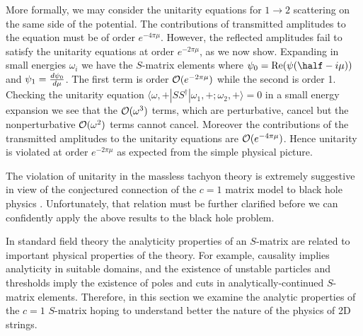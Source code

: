 More formally, we may
consider the unitarity equations for $1\to 2$ scattering on the
same side of the potential. The contributions of
 transmitted amplitudes
to the equation must be of order $e^{-4\pi \mu}$. However, the
reflected amplitudes fail to satisfy the unitarity equations at
order $e^{-2\pi \mu}$, as we now show. Expanding in small
energies $\omega_i$ we have the $S$-matrix elements
\eqn{}
where $\psi_0 = {\rm Re}(\psi(\half - i\mu))$ and
$\psi_1 = {d \psi_0 \over d\mu}$.
The first term is order ${\cal O}(e^{-2\pi\mu})$ while the second is order 1.
Checking the unitarity equation
$\langle \omega,+|S S^\dagger|\omega_1,+;\omega_2,+\rangle=0$
in a small energy expansion we
see that the ${\cal O}(\omega^3)$
terms, which are perturbative, cancel but
the nonperturbative ${\cal O}(\omega^2)$ terms cannot cancel. Moreover
the contributions of the transmitted amplitudes to the unitarity
equations are ${\cal O}(e^{-4\pi\mu})$. Hence unitarity
is violated at order $e^{-2\pi\mu}$ as expected from the simple physical
picture. 
 
The violation of unitarity in the massless tachyon theory
is extremely suggestive in view of the conjectured
connection of the $c=1$ matrix model to black hole physics
\nref{}%
\nref{}%
\nref{}%
\nref{}%
. 
Unfortunately, that relation must be further
clarified before we can confidently apply the above results
to the black hole problem.
 
 
 
In standard field theory the analyticity properties of an 
$S$-matrix are related to important physical properties of 
the theory.%
For example, causality implies analyticity in suitable domains, and 
the existence of unstable particles and thresholds imply the existence
of poles and cuts in analytically-continued $S$-matrix elements.
Therefore, in this section we examine the analytic properties
of the $c=1$ $S$-matrix 
hoping to understand better the nature of the physics of 2D 
strings.
 
